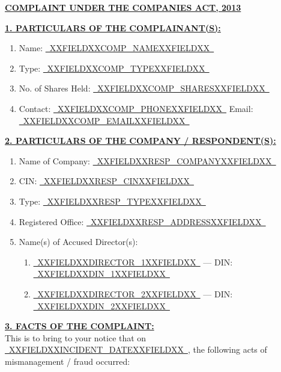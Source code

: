 \documentclass[12pt,a4paper]{article}
\newcommand{\fillline}[1]{\underline{~#1~}}
\begin{document}
\begin{center}
    \uline{\textbf{COMPLAINT UNDER THE COMPANIES ACT, 2013}}
\end{center}

\vspace{1em}

\noindent\textbf{\uline{1. PARTICULARS OF THE COMPLAINANT(S):}}
\begin{enumerate}[label=(\alph*)]
    \item Name: \fillline{XXFIELDXXCOMP_NAMEXXFIELDXX}
    \item Type: \fillline{XXFIELDXXCOMP_TYPEXXFIELDXX}
    \item No. of Shares Held: \fillline{XXFIELDXXCOMP_SHARESXXFIELDXX}
    \item Contact: \fillline{XXFIELDXXCOMP_PHONEXXFIELDXX} \quad Email: \fillline{XXFIELDXXCOMP_EMAILXXFIELDXX}
\end{enumerate}

\vspace{1em}

\noindent\textbf{\uline{2. PARTICULARS OF THE COMPANY / RESPONDENT(S):}}
\begin{enumerate}[label=(\alph*)]
    \item Name of Company: \fillline{XXFIELDXXRESP_COMPANYXXFIELDXX}
    \item CIN: \fillline{XXFIELDXXRESP_CINXXFIELDXX}
    \item Type: \fillline{XXFIELDXXRESP_TYPEXXFIELDXX}
    \item Registered Office: \fillline{XXFIELDXXRESP_ADDRESSXXFIELDXX}
    \item Name(s) of Accused Director(s):
    \begin{enumerate}[label=(\roman*)]
        \item \fillline{XXFIELDXXDIRECTOR_1XXFIELDXX} --- DIN: \fillline{XXFIELDXXDIN_1XXFIELDXX}
        \item \fillline{XXFIELDXXDIRECTOR_2XXFIELDXX} --- DIN: \fillline{XXFIELDXXDIN_2XXFIELDXX}
    \end{enumerate}
\end{enumerate}

\vspace{1em}

\noindent\textbf{\uline{3. FACTS OF THE COMPLAINT:}}\\
This is to bring to your notice that on \fillline{XXFIELDXXINCIDENT_DATEXXFIELDXX}, the following
acts of mismanagement / fraud occurred:
\end{document}
